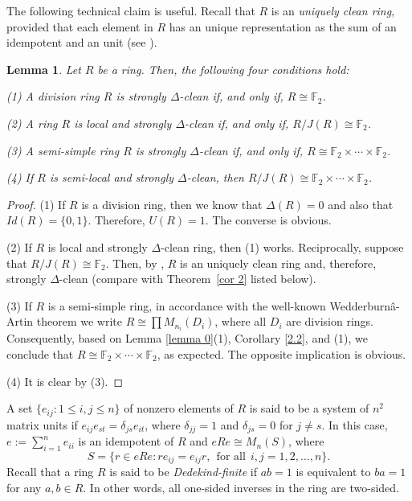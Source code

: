 \documentclass[12pt]{amsart}
\newtheorem{lemma}[theorem]{Lemma}
\theoremstyle{definition}
\begin{document}
The following technical claim is useful. Recall that $R$ is an {\it uniquely clean ring}, provided that each element in $R$ has an unique representation as the sum of an idempotent and an unit (see \cite{nzu}).

\begin{lemma}
Let $R$ be a ring. Then, the following four conditions hold:
	
(1) A division ring $R$ is strongly $\Delta$-clean if, and only if, $R \cong \mathbb{F}_2$.
	
(2) A ring $R$ is local and strongly $\Delta$-clean if, and only if, $R/J(R) \cong \mathbb{F}_2$.
	
(3) A semi-simple ring $R$ is strongly $\Delta$-clean if, and only if, $R \cong \mathbb{F}_2 \times \cdots \times \mathbb{F}_2$.
	
(4) If $R$ is semi-local and strongly $\Delta$-clean, then $R/J(R) \cong \mathbb{F}_2 \times \cdots \times \mathbb{F}_2$.
\end{lemma}

\begin{proof}
(1) If $R$ is a division ring, then we know that $\Delta(R)=0$ and also that $Id(R)=\{0,1\}$. Therefore, $U(R)={1}$. The converse is obvious.
	
(2) If $R$ is local and strongly $\Delta$-clean ring, then (1) works. Reciprocally, suppose that $R/J(R) \cong \mathbb{F}_2$. Then, by \cite[Theorem 15]{nzu}, $R$ is an uniquely clean ring and, therefore, strongly $\Delta$-clean (compare with Theorem~\ref{cor 2} listed below).
	
(3) If $R$ is a semi-simple ring, in accordance with the well-known Wedderburnâ-Artin theorem we write $R\cong \prod M_{n_i}(D_i)$, where all $D_i$ are division rings. Consequently, based on Lemma \ref{lemma 0}(1), Corollary \ref{2.2}, and (1), we conclude that $R \cong \mathbb{F}_2 \times \cdots \times \mathbb{F}_2$, as expected. The opposite implication is obvious.
	
(4) It is clear by (3).
\end{proof}

A set $\{e_{ij} : 1 \le i, j \le n\}$ of nonzero elements of $R$ is said to be a system of $n^2$ matrix units if $e_{ij}e_{st} = \delta_{js}e_{it}$, where $\delta_{jj} = 1$ and $\delta_{js} = 0$ for $j \neq s$. In this case, $e := \sum_{i=1}^{n} e_{ii}$ is an idempotent of $R$ and $eRe \cong M_n(S)$, where $$S = \{r \in eRe : re_{ij} = e_{ij}r,~~\textrm{for all}~~ i, j = 1, 2, . . . , n\}.$$
Recall that a ring $R$ is said to be {\it Dedekind-finite} if $ab=1$ is equivalent to $ba=1$ for any $a,b\in R$. In other words, all one-sided inverses in the ring are two-sided.
\end{document}
